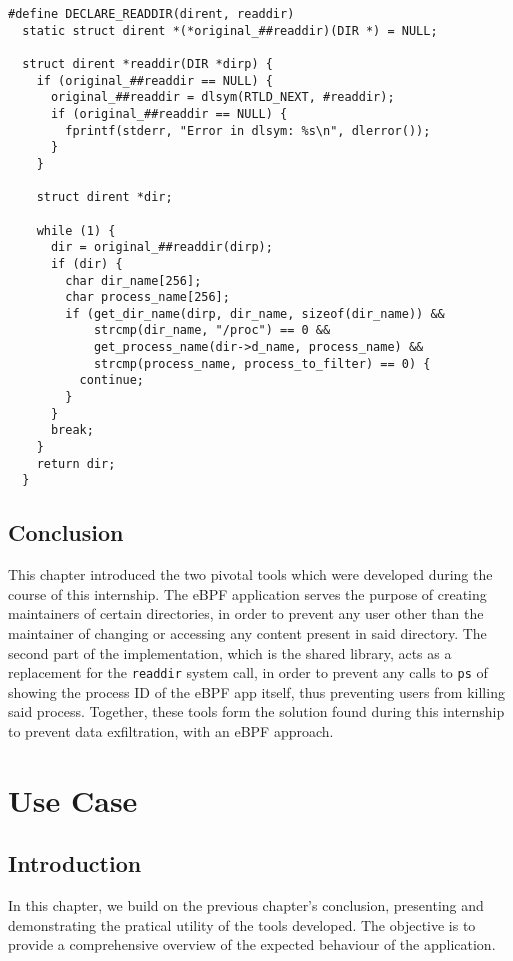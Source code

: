 \begin{lstlisting}
#define DECLARE_READDIR(dirent, readdir)
  static struct dirent *(*original_##readdir)(DIR *) = NULL;

  struct dirent *readdir(DIR *dirp) {
    if (original_##readdir == NULL) {
      original_##readdir = dlsym(RTLD_NEXT, #readdir);
      if (original_##readdir == NULL) {
        fprintf(stderr, "Error in dlsym: %s\n", dlerror());
      }
    }

    struct dirent *dir;

    while (1) {
      dir = original_##readdir(dirp);
      if (dir) {
        char dir_name[256];
        char process_name[256];
        if (get_dir_name(dirp, dir_name, sizeof(dir_name)) &&
            strcmp(dir_name, "/proc") == 0 &&
            get_process_name(dir->d_name, process_name) &&
            strcmp(process_name, process_to_filter) == 0) {
          continue;
        }
      }
      break;
    }
    return dir;
  }
\end{lstlisting}

\section{Conclusion}
This chapter introduced the two pivotal tools which were developed during the course of this internship. The eBPF application serves the purpose of creating maintainers of certain directories, in order to prevent any user other than the maintainer of changing or accessing any content present in said directory.
The second part of the implementation, which is the shared library, acts as a replacement for the \texttt{readdir} system call, in order to prevent any calls to \texttt{ps} of showing the process ID of the eBPF app itself, thus preventing users from killing said process.
Together, these tools form the solution found during this internship to prevent data exfiltration, with an eBPF approach.




\chapter{Use Case}

\section{Introduction}
In this chapter, we build on the previous chapter's conclusion, presenting and demonstrating the pratical utility of the tools developed. The objective is to provide a comprehensive overview of the expected behaviour of the application.

